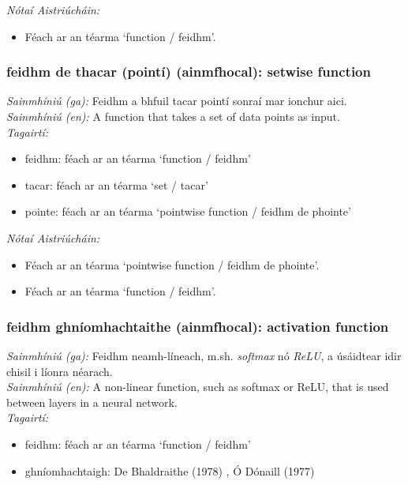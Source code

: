 \documentclass{article}
\begin{document}
 \noindent \textit{Nótaí Aistriúcháin:}
\begin{itemize}
	\item Féach ar an téarma `function / feidhm'.
\end{itemize}


\subsubsection*{feidhm de thacar (pointí) (ainmfhocal): setwise function}
 \noindent \textit{Sainmhíniú (ga):} Feidhm a bhfuil tacar pointí sonraí mar ionchur aici.
\\
 \noindent \textit{Sainmhíniú (en):} A function that takes a set of data points as input.
\\
 \noindent \textit{Tagairtí:}
\begin{itemize}
	\item feidhm: féach ar an téarma `function / feidhm'
	\item tacar: féach ar an téarma `set / tacar'
	\item pointe: féach ar an téarma `pointwise function / feidhm de phointe'
\end{itemize}

 \noindent \textit{Nótaí Aistriúcháin:}
\begin{itemize}
	\item Féach ar an téarma `pointwise function / feidhm de phointe'.
	\item Féach ar an téarma `function / feidhm'.
\end{itemize}


\subsubsection*{feidhm ghníomhachtaithe (ainmfhocal): activation function}
 \noindent \textit{Sainmhíniú (ga):} Feidhm neamh-líneach, m.sh.  \noindent \textit{softmax} nó  \noindent \textit{ReLU}, a úsáidtear idir chisil i líonra néarach.
\\
 \noindent \textit{Sainmhíniú (en):} A non-linear function, such as softmax or ReLU, that is used between layers in a neural network.
\\
 \noindent \textit{Tagairtí:}
\begin{itemize}
	\item feidhm: féach ar an téarma `function / feidhm'
	\item ghníomhachtaigh: De Bhaldraithe (1978) \cite{de-bhaldraithe}, Ó Dónaill (1977) \cite{odonaill}
\end{itemize}
\end{document}
